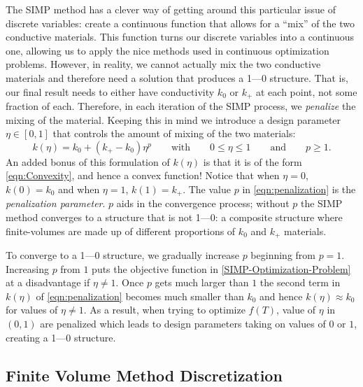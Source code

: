 The SIMP method has a clever way of getting around this particular issue of discrete variables: create a continuous function that allows for a ``mix'' of the two conductive materials. This function turns our discrete variables into a continuous one, allowing us to apply the nice methods used in continuous optimization problems. However, in reality, we cannot actually mix the two conductive materials and therefore need a solution that produces a 1---0 structure. That is, our final result needs to either have conductivity $k_0$ or $k_+$ at each point, not some fraction of each. Therefore, in each iteration of the SIMP process, we \textit{penalize} the mixing of the material. Keeping this in mind we introduce a design parameter $\eta\in\left[0,1\right]$ that controls the amount of mixing of the two materials:
\begin{equation}
	k\left(\eta\right)=k_0+\left(k_+-k_0\right)\eta^p\qquad\text{with}\qquad 0\leq\eta\leq 1\qquad\text{and}\qquad p\geq1.\label{eqn:penalization}
\end{equation}
An added bonus of this formulation of $k(\eta)$ is that it is of the form \eqref{eqn:Convexity}, and hence a convex function! Notice that when $\eta=0$, $k\left(0\right)=k_0$ and when $\eta=1$, $k\left(1\right)=k_+$. The value $p$ in \eqref{eqn:penalization} is the \textit{penalization parameter}. $p$ aids in the convergence process; without $p$ the SIMP method converges to a structure that is not 1---0: a composite structure where finite-volumes are made up of different proportions of $k_0$ and $k_+$ materials.

To converge to a 1---0 structure, we gradually increase $p$ beginning from $p=1$. Increasing $p$ from $1$ puts the objective function in \eqref{SIMP-Optimization-Problem} at a disadvantage if $\eta\neq1$. Once $p$ gets much larger than $1$ the second term in $k(\eta)$ of \eqref{eqn:penalization} becomes much smaller than $k_0$ and hence $k(\eta)\approx k_0$ for values of $\eta\neq1$. As a result, when trying to optimize $f(T)$, value of $\eta$ in $(0,1)$ are penalized which leads to design parameters taking on values of $0$ or $1$, creating a 1---0 structure.

\subsection{Finite Volume Method Discretization}

